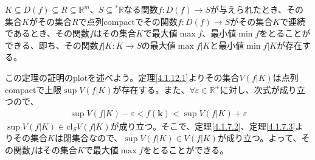 \documentclass[dvipdfmx]{jsarticle}
\begin{document}
\begin{thm}\label{4.1.12.2}
$K \subseteq D(f) \subseteq R \subseteq \mathbb{R}^{m}$、$S \subseteq{}^{*}\mathbb{R}$なる関数$f:D(f) \rightarrow S$が与えられたとき、その集合$K$がその集合$R$で点列compactでその関数$f:D(f) \rightarrow S$がその集合$K$で連続であるとき、その関数$f$はその集合$K$で最大値$\max f$、最小値$\min f$をとることができる、即ち、その関数$f|K:K \rightarrow S$の最大値$\max{f|K}$と最小値$\min{f|K}$が存在する。
\end{thm}\par
この定理の証明のplotを述べよう。定理\ref{4.1.12.1}よりその集合$V\left( f|K \right)$は点列compactで上限$\sup{V\left( f|K \right)}$が存在する。また、$\forall\varepsilon \in \mathbb{R}^{+}$に対し、次式が成り立つので、
\begin{align*}
\sup{V\left( f|K \right)} - \varepsilon < f\left( \mathbf{k} \right) < \sup{V\left( f|K \right)} + \varepsilon
\end{align*}
$\sup{V\left( f|K \right)} \in \mathrm{cl}_{S}{V\left( f|K \right)}$が成り立つ。そこで、定理\ref{4.1.7.2}、定理\ref{4.1.7.3}よりその集合$K$は閉集合なので、$\sup{V\left( f|K \right)} \in V\left( f|K \right)$が成り立つ。よって、その関数$f$はその集合$K$で最大値$\max f$をとることができる。
\end{document}
